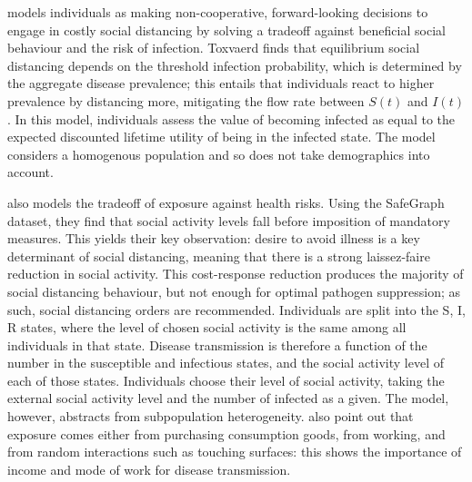\documentclass{article}
\begin{document}
\textcite{toxvaerdEquilibriumSocialDistancing2020} models individuals as making non-cooperative, forward-looking decisions to engage in costly social distancing by solving a tradeoff against beneficial social behaviour and the risk of infection. Toxvaerd finds that equilibrium social distancing depends on the threshold infection probability, which is determined by the aggregate disease prevalence; this entails that individuals react to higher prevalence by distancing more, mitigating the flow rate between \(S(t)\) and \(I(t)\). In this model, individuals assess the value of becoming infected as equal to the expected discounted lifetime utility of being in the infected state. The model considers a homogenous population and so does not take demographics into account.

\textcite{farboodiInternalExternalEffects2020} also models the tradeoff of exposure against health risks. Using the SafeGraph dataset, they find that social activity levels fall before imposition of mandatory measures. This yields their key observation: desire to avoid illness is a key determinant of social distancing, meaning that there is a strong laissez-faire reduction in social activity. This cost-response reduction produces the majority of social distancing behaviour, but not enough for optimal pathogen suppression; as such, social distancing orders are recommended. Individuals are split into the S, I, R states, where the level of chosen social activity is the same among all individuals in that state. Disease transmission is therefore a function of the number in the susceptible and infectious states, and the social activity level of each of those states. Individuals choose their level of social activity, taking the external social activity level and the number of infected as a given. The model, however, abstracts from subpopulation heterogeneity. \textcite{eichenbaumMacroeconomicsEpidemics2020} also point out that exposure comes either from purchasing consumption goods, from working, and from random interactions such as touching surfaces: this shows the importance of income and mode of work for disease transmission. 
\end{document}
